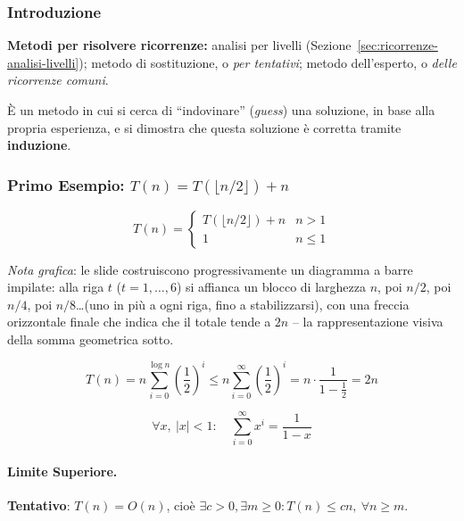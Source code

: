 \documentclass[12pt, a4paper]{article}
\begin{document}
\subsubsection{Introduzione}

\textbf{Metodi per risolvere ricorrenze:} analisi per livelli (Sezione~\ref{sec:ricorrenze-analisi-livelli}); metodo di sostituzione, o \textit{per tentativi}; metodo dell'esperto, o \textit{delle ricorrenze comuni}.

\begin{tcolorbox}[colback=lightergray!10, colframe=tocsec, title=\textbf{Metodo di Sostituzione}]
\label{def:metodo-sostituzione}
È un metodo in cui si cerca di ``indovinare'' (\textit{guess}) una soluzione, in base alla propria esperienza, e si dimostra che questa soluzione è corretta tramite \textbf{induzione}.
\end{tcolorbox}

\subsubsection{Primo Esempio: \texorpdfstring{$T(n)=T(\lfloor n/2\rfloor)+n$}{T(n)=T(floor(n/2))+n}}

$$T(n) = \begin{cases} T(\lfloor n/2\rfloor) + n & n>1 \\ 1 & n\le 1 \end{cases}$$

\textit{Nota grafica}: le slide costruiscono progressivamente un diagramma a barre impilate: alla riga $t$ ($t=1,\ldots,6$) si affianca un blocco di larghezza $n$, poi $n/2$, poi $n/4$, poi $n/8$\ldots (uno in più a ogni riga, fino a stabilizzarsi), con una freccia orizzontale finale che indica che il totale tende a $2n$ -- la rappresentazione visiva della somma geometrica sotto.

$$T(n) = n\sum_{i=0}^{\log n}\left(\frac{1}{2}\right)^i \le n\sum_{i=0}^{\infty}\left(\frac{1}{2}\right)^i = n\cdot\frac{1}{1-\frac{1}{2}} = 2n$$

\begin{tcolorbox}[colback=lightergray!5, colframe=tocsubsec, title=\textbf{Serie Geometrica Decrescente Infinita}]
\label{prop:serie-geometrica-infinita}
$$\forall x,\ |x|<1: \quad \sum_{i=0}^{\infty}x^i = \frac{1}{1-x}$$
\end{tcolorbox}

\paragraph{Limite Superiore.} \textbf{Tentativo}: $T(n)=O(n)$, cioè $\exists c>0,\exists m\ge 0: T(n)\le cn,\ \forall n\ge m$.
\end{document}

